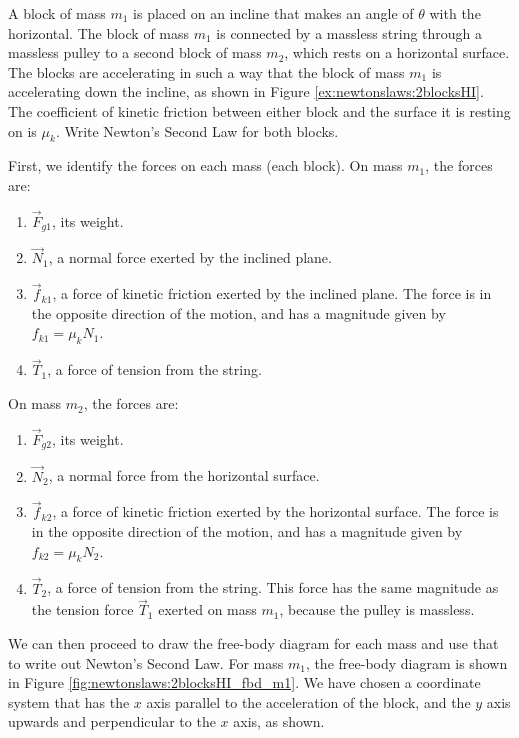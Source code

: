 \begin{example}{
A block of mass $m_1$ is placed on an incline that makes an angle of $\theta$ with the horizontal. The block of mass $m_1$ is connected by a massless string through a massless pulley to a second block of mass $m_2$, which rests on a horizontal surface. The blocks are accelerating in such a way that the block of mass $m_1$ is accelerating down the incline, as shown in Figure \ref{ex:newtonslaws:2blocksHI}. The coefficient of kinetic friction between either block and the surface it is resting on is $\mu_k$. Write Newton's Second Law for both blocks.}
\label{ex:newtonslaws:2blocksHI}

First, we identify the forces on each mass (each block). On mass $m_1$, the forces are:
\begin{enumerate}
\item $\vec F_{g1}$, its weight.
\item $\vec N_1$, a normal force exerted by the inclined plane.
\item $\vec f_{k1}$, a force of kinetic friction exerted by the inclined plane. The force is in the opposite direction of the motion, and has a magnitude given by $f_{k1}=\mu_kN_1$.
\item $\vec T_1$, a force of tension from the string. 
\end{enumerate}

On mass $m_2$, the forces are:

\begin{enumerate}
\item $\vec F_{g2}$, its weight.
\item $\vec N_2$, a normal force from the horizontal surface.
\item $\vec f_{k2}$, a force of kinetic friction exerted by the horizontal surface. The force is in the opposite direction of the motion, and has a magnitude given by $f_{k2}=\mu_kN_2$.
\item $\vec T_2$, a force of tension from the string. This force has the same magnitude as the tension force $\vec T_1$ exerted on mass $m_1$, because the pulley is massless. 
\end{enumerate}

We can then proceed to draw the free-body diagram for each mass and use that to write out Newton's Second Law. For mass $m_1$, the free-body diagram is shown in Figure \ref{fig:newtonslaws:2blocksHI_fbd_m1}. We have chosen a coordinate system that has the $x$ axis parallel to the acceleration of the block, and the $y$ axis upwards and perpendicular to the $x$ axis, as shown. 


\end{example}
